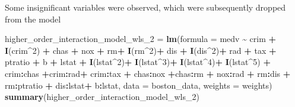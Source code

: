 \documentclass[
]{article}
\newenvironment{Shaded}{\begin{snugshade}}{\end{snugshade}}
\newcommand{\AttributeTok}[1]{\textcolor[rgb]{0.13,0.29,0.53}{#1}}
\newcommand{\DecValTok}[1]{\textcolor[rgb]{0.00,0.00,0.81}{#1}}
\newcommand{\FunctionTok}[1]{\textcolor[rgb]{0.13,0.29,0.53}{\textbf{#1}}}
\newcommand{\NormalTok}[1]{#1}
\newcommand{\OtherTok}[1]{\textcolor[rgb]{0.56,0.35,0.01}{#1}}
\newcommand{\SpecialCharTok}[1]{\textcolor[rgb]{0.81,0.36,0.00}{\textbf{#1}}}
\begin{document}
Some insignificant variables were observed, which were subsequently
dropped from the model

\begin{Shaded}
\begin{Highlighting}[]
\NormalTok{higher\_order\_interaction\_model\_wls\_2 }\OtherTok{=} \FunctionTok{lm}\NormalTok{(}\AttributeTok{formula =}\NormalTok{ medv }\SpecialCharTok{\textasciitilde{}}\NormalTok{ crim }\SpecialCharTok{+} \FunctionTok{I}\NormalTok{(crim}\SpecialCharTok{\^{}}\DecValTok{2}\NormalTok{) }\SpecialCharTok{+}\NormalTok{ chas }\SpecialCharTok{+}\NormalTok{ nox }\SpecialCharTok{+}\NormalTok{ rm}\SpecialCharTok{+} \FunctionTok{I}\NormalTok{(rm}\SpecialCharTok{\^{}}\DecValTok{2}\NormalTok{)}\SpecialCharTok{+}\NormalTok{ dis }\SpecialCharTok{+} \FunctionTok{I}\NormalTok{(dis}\SpecialCharTok{\^{}}\DecValTok{2}\NormalTok{)}\SpecialCharTok{+}\NormalTok{ rad }\SpecialCharTok{+}\NormalTok{ tax }\SpecialCharTok{+}\NormalTok{ ptratio }\SpecialCharTok{+}\NormalTok{ b }\SpecialCharTok{+}\NormalTok{ lstat }\SpecialCharTok{+} \FunctionTok{I}\NormalTok{(lstat}\SpecialCharTok{\^{}}\DecValTok{2}\NormalTok{)}\SpecialCharTok{+} \FunctionTok{I}\NormalTok{(lstat}\SpecialCharTok{\^{}}\DecValTok{3}\NormalTok{)}\SpecialCharTok{+} \FunctionTok{I}\NormalTok{(lstat}\SpecialCharTok{\^{}}\DecValTok{4}\NormalTok{)}\SpecialCharTok{+} \FunctionTok{I}\NormalTok{(lstat}\SpecialCharTok{\^{}}\DecValTok{5}\NormalTok{) }\SpecialCharTok{+}\NormalTok{ crim}\SpecialCharTok{:}\NormalTok{chas  }\SpecialCharTok{+}\NormalTok{crim}\SpecialCharTok{:}\NormalTok{rad}\SpecialCharTok{+}\NormalTok{ crim}\SpecialCharTok{:}\NormalTok{tax }\SpecialCharTok{+}\NormalTok{ chas}\SpecialCharTok{:}\NormalTok{nox }\SpecialCharTok{+}\NormalTok{chas}\SpecialCharTok{:}\NormalTok{rm }\SpecialCharTok{+}\NormalTok{ nox}\SpecialCharTok{:}\NormalTok{rad }\SpecialCharTok{+}\NormalTok{ rm}\SpecialCharTok{:}\NormalTok{dis }\SpecialCharTok{+}\NormalTok{ rm}\SpecialCharTok{:}\NormalTok{ptratio }\SpecialCharTok{+}\NormalTok{ dis}\SpecialCharTok{:}\NormalTok{lstat}\SpecialCharTok{+}\NormalTok{ b}\SpecialCharTok{:}\NormalTok{lstat, }\AttributeTok{data =}\NormalTok{ boston\_data, }\AttributeTok{weights =}\NormalTok{ weights)}
\FunctionTok{summary}\NormalTok{(higher\_order\_interaction\_model\_wls\_2)}
\end{Highlighting}
\end{Shaded}
\end{document}
